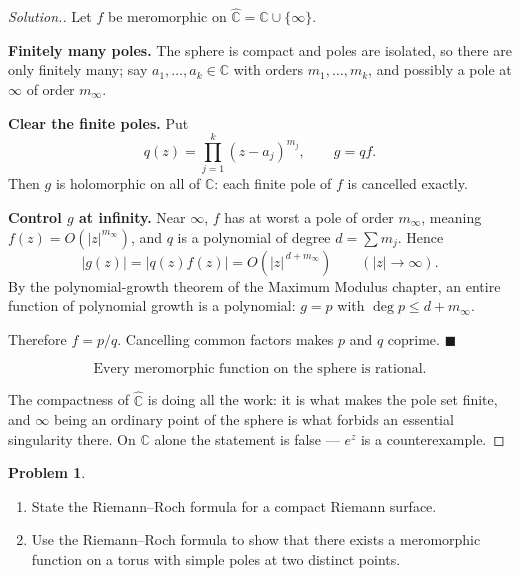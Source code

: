 \documentclass[11pt,a4paper]{article}
\theoremstyle{definition}
\newtheorem{problemx}{Problem}[section]
\newenvironment{problem}{\begin{problemx}}{\end{problemx}}
\newenvironment{solution}
  {\renewcommand{\qedsymbol}{}\begin{proof}[\textit{Solution}.]}
  {\end{proof}}
\begin{document}
\begin{solution}
Let $f$ be meromorphic on $\widehat{\mathbb{C}} = \mathbb{C}\cup\{\infty\}$.

\textbf{Finitely many poles.} The sphere is compact and poles are isolated, so
there are only finitely many; say $a_1,\ldots,a_k \in \mathbb{C}$ with orders
$m_1,\ldots,m_k$, and possibly a pole at $\infty$ of order $m_\infty$.

\textbf{Clear the finite poles.} Put
$$q(z) = \prod^{k}_{j=1}(z-a_j)^{m_j},
\qquad g = qf .$$
Then $g$ is holomorphic on all of $\mathbb{C}$: each finite pole of $f$ is
cancelled exactly.

\textbf{Control $g$ at infinity.} Near $\infty$, $f$ has at worst a pole of order
$m_\infty$, meaning $f(z) = O\!\left(\left|z\right|^{m_\infty}\right)$, and $q$ is
a polynomial of degree $d = \sum m_j$. Hence
$$\left|g(z)\right| = \left|q(z)f(z)\right|
= O\!\left(\left|z\right|^{\,d+m_\infty}\right)
\qquad (\left|z\right| \to \infty).$$
By the polynomial-growth theorem of the Maximum Modulus chapter, an entire function
of polynomial growth is a polynomial: $g = p$ with $\deg p \leq d+m_\infty$.

Therefore $f = p/q$. Cancelling common factors makes $p$ and $q$ coprime.
$\blacksquare$

$$\boxed{\text{Every meromorphic function on the sphere is rational.}}$$

The compactness of $\widehat{\mathbb{C}}$ is doing all the work: it is what makes
the pole set finite, and $\infty$ being an ordinary point of the sphere is what
forbids an essential singularity there. On $\mathbb{C}$ alone the statement is
false --- $e^{z}$ is a counterexample.
\end{solution}


\begin{problem}
\begin{enumerate}
\item[(a).] State the Riemann--Roch formula for a compact Riemann surface.
\item[(b).] Use the Riemann--Roch formula to show that there exists a meromorphic
function on a torus with simple poles at two distinct points.
\end{enumerate}
\end{problem}
\end{document}
